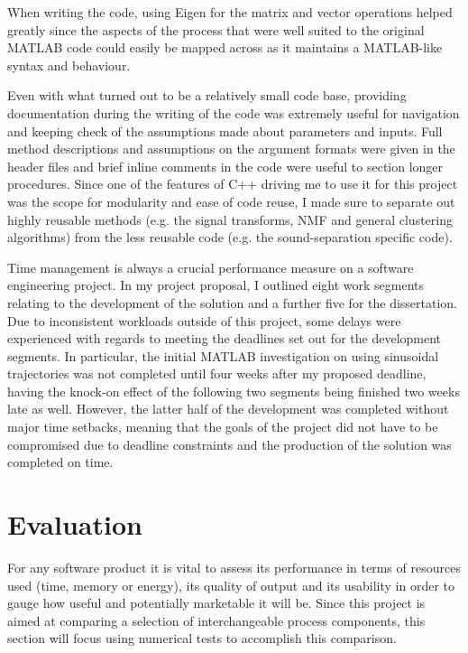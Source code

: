 \documentclass[12pt,a4paper,twoside,openright]{report}
\begin{document}
When writing the code, using Eigen for the matrix and vector operations helped greatly since the aspects of the process that were well suited to the original MATLAB code could easily be mapped across as it maintains a MATLAB-like syntax and behaviour.

Even with what turned out to be a relatively small code base, providing documentation during the writing of the code was extremely useful for navigation and keeping check of the assumptions made about parameters and inputs. Full method descriptions and assumptions on the argument formats were given in the header files and brief inline comments in the code were useful to section longer procedures. Since one of the features of C++ driving me to use it for this project was the scope for modularity and ease of code reuse, I made sure to separate out highly reusable methods (e.g. the signal transforms, NMF and general clustering algorithms) from the less reusable code (e.g. the sound-separation specific code).

Time management is always a crucial performance measure on a software engineering project. In my project proposal, I outlined eight work segments relating to the development of the solution and a further five for the dissertation. Due to inconsistent workloads outside of this project, some delays were experienced with regards to meeting the deadlines set out for the development segments. In particular, the initial MATLAB investigation on using sinusoidal trajectories was not completed until four weeks after my proposed deadline, having the knock-on effect of the following two segments being finished two weeks late as well. However, the latter half of the development was completed without major time setbacks, meaning that the goals of the project did not have to be compromised due to deadline constraints and the production of the solution was completed on time.

\chapter{Evaluation}


For any software product it is vital to assess its performance in terms of resources used (time, memory or energy), its quality of output and its usability in order to gauge how useful and potentially marketable it will be. Since this project is aimed at comparing a selection of interchangeable process components, this section will focus using numerical tests to accomplish this comparison.
\end{document}
